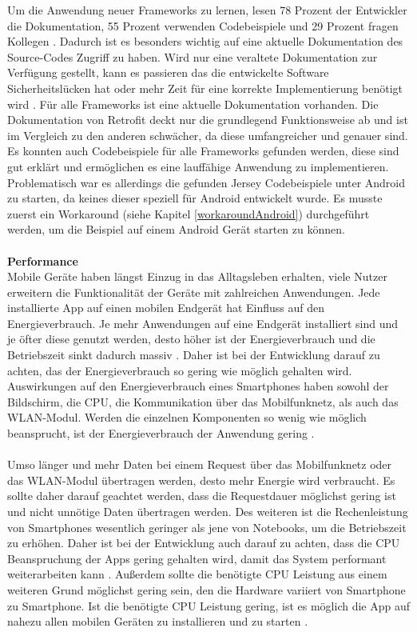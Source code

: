 Um die Anwendung neuer Frameworks zu lernen, lesen 78 Prozent der Entwickler die Dokumentation, 55 Prozent verwenden Codebeispiele und 29 Prozent fragen Kollegen \cite{robillard:apis}. Dadurch ist es besonders wichtig auf eine aktuelle Dokumentation des Source-Codes Zugriff zu haben. Wird nur eine veraltete Dokumentation zur Verfügung gestellt, kann es passieren das die entwickelte Software Sicherheitslücken hat oder mehr Zeit für eine korrekte Implementierung benötigt wird \cite{lethbridge:documentation}. Für alle Frameworks ist eine aktuelle Dokumentation vorhanden. Die Dokumentation von Retrofit deckt nur die grundlegend Funktionsweise ab und ist im Vergleich zu den anderen schwächer, da diese umfangreicher und genauer sind. Es konnten auch Codebeispiele für alle Frameworks gefunden werden, diese sind gut erklärt und ermöglichen es eine lauffähige Anwendung zu implementieren. Problematisch war es allerdings die gefunden Jersey Codebeispiele unter Android zu starten, da keines dieser speziell für Android entwickelt wurde. Es musste zuerst ein Workaround (siehe Kapitel \ref{workaroundAndroid}) durchgeführt werden, um die Beispiel auf einem Android Gerät starten zu können.
\\\\
\textbf{Performance}\\
Mobile Geräte haben längst Einzug in das Alltagsleben erhalten, viele Nutzer erweitern die Funktionalität der Geräte mit zahlreichen Anwendungen. Jede installierte App auf einen mobilen Endgerät hat Einfluss auf den Energieverbrauch. Je mehr Anwendungen auf eine Endgerät installiert sind und je öfter diese genutzt werden, desto höher ist der Energieverbrauch und die Betriebszeit sinkt dadurch massiv \cite{Wil2012}. Daher ist bei der Entwicklung darauf zu achten, das der Energieverbrauch so gering wie möglich gehalten wird. Auswirkungen auf den Energieverbrauch eines Smartphones haben sowohl der Bildschirm, die \acrfull{CPU}, die Kommunikation über das Mobilfunknetz, als auch das WLAN-Modul. Werden die einzelnen Komponenten so wenig wie möglich beansprucht, ist der Energieverbrauch der Anwendung gering \cite{vetter}. 
\\\\
Umso länger und mehr Daten bei einem Request über das Mobilfunknetz oder das WLAN-Modul übertragen werden, desto mehr Energie wird verbraucht. Es sollte daher darauf geachtet werden, dass die Requestdauer möglichst gering ist und nicht unnötige Daten übertragen werden. Des weiteren ist die Rechenleistung von Smartphones  wesentlich geringer als jene von Notebooks, um die Betriebszeit zu erhöhen. Daher ist bei der Entwicklung auch darauf zu achten, dass die CPU Beanspruchung der Apps gering gehalten wird, damit das System performant weiterarbeiten kann \cite{mittal:energy}. Außerdem sollte die benötigte CPU Leistung aus einem weiteren Grund möglichst gering sein, den die Hardware variiert von Smartphone zu Smartphone. Ist die benötigte CPU Leistung gering, ist es möglich die App auf nahezu allen mobilen Geräten zu installieren und zu starten \cite{joorabchi:challenges}. 
